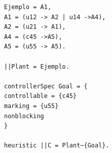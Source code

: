 


\begin{lstlisting}[language = mtsa, caption=Test 1 a modo de ejemplo] 
Ejemplo = A1,
A1 = (u12 -> A2 | u14 ->A4),
A2 = (u21 -> A1),
A4 = (c45 ->A5),
A5 = (u55 -> A5).

||Plant = Ejemplo.

controllerSpec Goal = {
controllable = {c45}
marking = {u55}
nonblocking
}

heuristic ||C = Plant~{Goal}.
\end{lstlisting}
